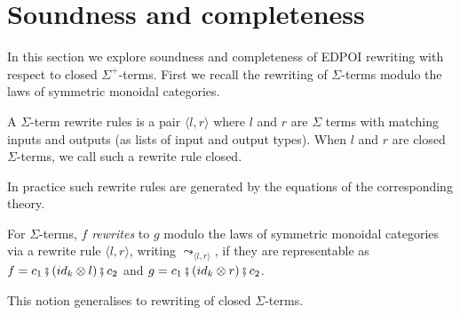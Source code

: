 \section{Soundness and completeness}

In this section we explore soundness and completeness of EDPOI rewriting with respect to closed $\Sigma^{+}$-terms.
First we recall the rewriting of $\Sigma$-terms modulo the laws of symmetric monoidal categories.

\begin{definition}
	A $\Sigma$-term rewrite rules is a pair $\langle l, r \rangle$ where $l$ and $r$ are $\Sigma$ terms with matching inputs and outputs (as lists of input and output types).
	When $l$ and $r$ are closed $\Sigma$-terms, we call such a rewrite rule closed.
\end{definition}

In practice such rewrite rules are generated by the equations of the corresponding theory.

\begin{definition}%
	\label{def:rewrite}
	For $\Sigma$-terms, $f$ \emph{rewrites} to $g$ modulo the laws of symmetric monoidal categories via a rewrite rule $\langle l, r \rangle$, writing $\leadsto_{\langle l, r \rangle}$, if they are representable as
	$
		f = c_{1} \fatsemi (id_{k} \otimes l) \fatsemi c_{2} $ and $ g = c_{1}\fatsemi(id_{k} \otimes r)\fatsemi c_{2}
	$.
\end{definition}
This notion generalises to rewriting of closed $\Sigma$-terms.

